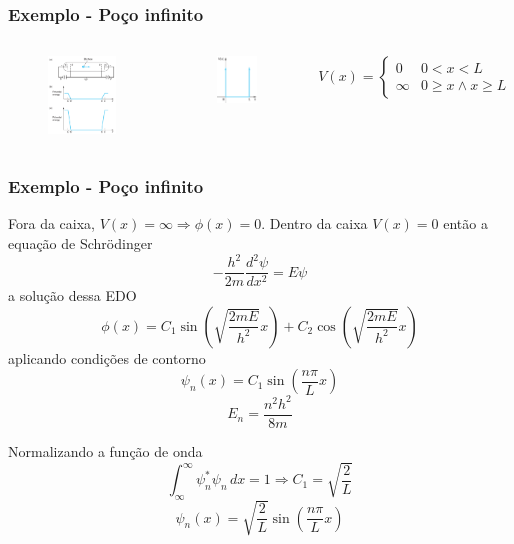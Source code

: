 \documentclass[12pt,brazil,table]{beamer}
\begin{document}
\begin{frame}
  \frametitle{Exemplo - Poço infinito}
  \begin{columns}[c]

  \column{5cm}
  
  \begin{figure}
    \includegraphics[width=5cm]{figuras/fig18a}
  \end{figure}
  
  \column{5cm}
  
  \begin{figure}
    \includegraphics[width=3cm]{figuras/fig18b}
  \end{figure}
  
  \fontsize{10pt}{11pt}\selectfont
  \[
    V(x) = \begin{cases}
      0 & 0< x < L\\
      \infty & 0 \geq x \wedge x\geq L
    \end{cases}
  \]
  
  
  \end{columns}
\end{frame}


\begin{frame}
  \frametitle{Exemplo - Poço infinito}  
  \fontsize{8.5pt}{11pt}\selectfont
  
  Fora da caixa, $V(x) = \infty \Rightarrow \phi(x) = 0$. Dentro da caixa $V(x) = 0$ então a equação de Schrödinger
  \[
   -\dfrac{h^2}{2m}\dfrac{d^2\psi}{dx^2}=E\psi
  \]
  a solução dessa EDO
  \[
   \phi(x) = C_1 \sin \left( \sqrt{\dfrac{2mE}{h^2}}x \right) + C_2 \cos\left( \sqrt{\dfrac{2mE}{h^2}}x \right)
  \]
  aplicando condições de contorno 
  \[
   \psi_n(x) = C_1 \sin \left( \dfrac{n\pi}{L}x \right)
  \]
  \[
   E_n = \dfrac{n^2h^2}{8m}
  \]

  Normalizando a função de onda
  \[
   \int_\infty^\infty \psi_n^*\psi_n\, dx= 1 \Rightarrow C_1 = \sqrt{\dfrac{2}{L}}
  \]
  \[
   \psi_n(x) = \sqrt{\dfrac{2}{L}} \sin \left( \dfrac{n\pi}{L}x \right)
  \]
  
\end{frame}
\end{document}
